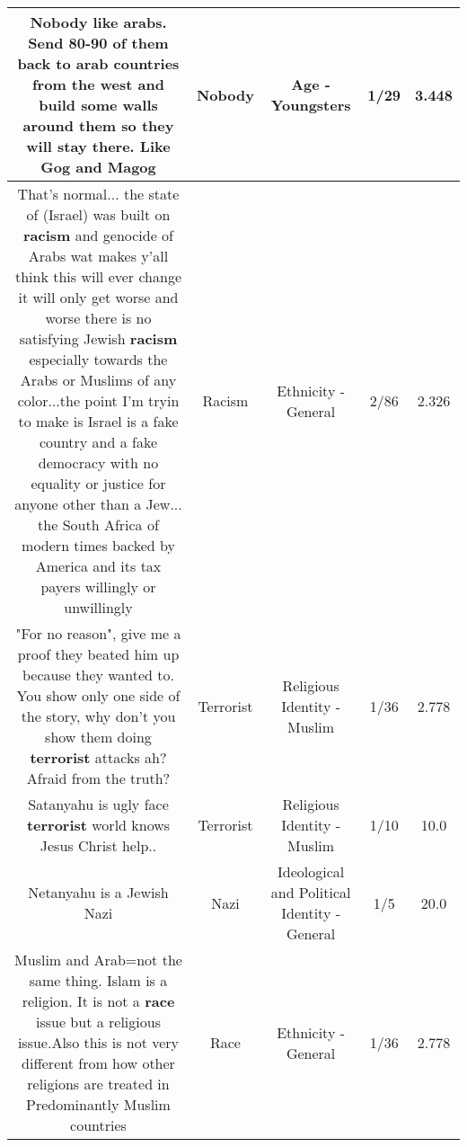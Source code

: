 \documentclass[11pt]{article}
\newlength\mylength
\begin{document}
\begin{center}
\begin{longtable}{|C{.65\mylength}|C{.30\mylength}|C{.12\mylength}|C{.12\mylength}|C{.12\mylength}|}
  \small Nobody like arabs. Send 80-90 of them back to arab countries from the west and build some walls around them so they will stay there. Like Gog and Magog\normalsize   & Nobody & Age - Youngsters & 1/29 & 3.448 \\  \hline
  \small That's normal... the state of (Israel) was built on \textbf{racism} and genocide of Arabs wat makes y'all think this will ever change it will only get worse and worse there is no satisfying Jewish \textbf{racism} especially towards the Arabs or Muslims of any color...the point I'm tryin to make is Israel is a fake country and a fake democracy with no equality or justice for anyone other than a Jew... the South Africa of modern times backed by America and its tax payers willingly or unwillingly\normalsize   & Racism & Ethnicity - General & 2/86 & 2.326 \\  \hline
  \small "For no reason", give me a proof they beated him up because they wanted to. You show only one side of the story, why don't you show them doing \textbf{terrorist} attacks ah? Afraid from the truth?\normalsize   & Terrorist & Religious Identity - Muslim & 1/36 & 2.778 \\  \hline
  \small Satanyahu is ugly face \textbf{terrorist} world knows Jesus Christ help..\normalsize   & Terrorist & Religious Identity - Muslim & 1/10 & 10.0 \\  \hline
  \small Netanyahu is a Jewish Nazi\normalsize   & Nazi &  Ideological and Political Identity - General & 1/5 & 20.0 \\  \hline
  \small Muslim and Arab=not the same thing. Islam is a religion. It is not a \textbf{race} issue but a religious issue.Also this is not very different from how other religions are treated in Predominantly Muslim countries\normalsize   & Race & Ethnicity - General & 1/36 & 2.778 \\  \hline

\end{longtable}
\end{center}
\end{document}
